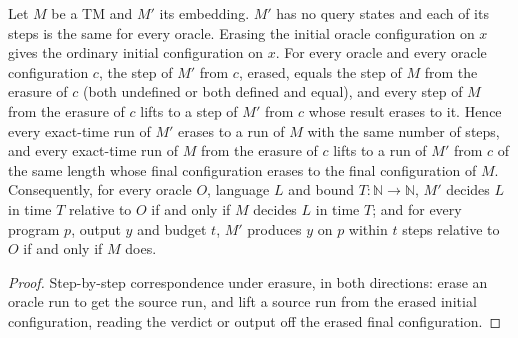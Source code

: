 \begin{theorem}
  \label{thm:barriers-to-oracle-conservative}
  \leanok
  Let $M$ be a TM and $M'$ its embedding. $M'$ has no query states and each of
  its steps is the same for every oracle. Erasing the initial oracle
  configuration on $x$ gives the ordinary initial configuration on $x$. For
  every oracle and every oracle configuration $c$, the step of $M'$ from $c$,
  erased, equals the step of $M$ from the erasure of $c$ (both undefined or
  both defined and equal), and every step of $M$ from the erasure of $c$ lifts
  to a step of $M'$ from $c$ whose result erases to it. Hence every exact-time
  run of $M'$ erases to a run of $M$ with the same number of steps, and every
  exact-time run of $M$
  from the erasure of $c$ lifts to a run of $M'$ from $c$ of the same length
  whose final configuration erases to the final configuration of $M$.
  Consequently, for every oracle $O$, language $L$ and bound
  $T : \mathbb{N} \to \mathbb{N}$, $M'$ decides $L$ in time $T$ relative to $O$
  if and only if $M$ decides $L$ in time $T$; and for every program $p$, output
  $y$ and budget $t$, $M'$ produces $y$ on $p$ within $t$ steps relative to $O$
  if and only if $M$ does.
\end{theorem}
\begin{proof}
  \leanok
  Step-by-step correspondence under erasure, in both directions: erase an
  oracle run to get the source run, and lift a source run from the erased
  initial configuration, reading the verdict or output off the erased final
  configuration.
\end{proof}

